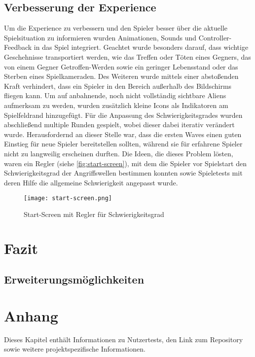 \documentclass[11pt]{scrartcl}
\begin{document}
\subsection{Verbesserung der Experience}
Um die Experience zu verbessern und den Spieler besser über die aktuelle Spielsituation zu informieren wurden Animationen, Sounds und Controller-Feedback in das Spiel integriert. Geachtet wurde besonders darauf, dass wichtige Geschehnisse transportiert werden, wie das Treffen oder Töten eines Gegners, das von einem Gegner Getroffen-Werden sowie ein geringer Lebensstand oder das Sterben eines Spielkameraden. Des Weiteren wurde mittels einer abstoßenden Kraft verhindert, dass ein Spieler in den Bereich außerhalb des Bildschirms fliegen kann. Um auf anbahnende, noch nicht vollständig sichtbare Aliens aufmerksam zu werden, wurden zusätzlich kleine Icons als Indikatoren am Spielfeldrand hinzugefügt.
Für die Anpassung des Schwierigkeitsgrades wurden abschließend multiple Runden gespielt, wobei dieser dabei iterativ verändert wurde. Herausfordernd an dieser Stelle war, dass die ersten Waves einen guten Einstieg für neue Spieler bereitstellen sollten, während sie für erfahrene Spieler nicht zu langweilig erscheinen durften. Die Ideen, die dieses Problem lösten, waren ein Regler (siehe \autoref{fig:start-screen}), mit dem die Spieler vor Spielstart den Schwierigkeitsgrad der Angriffswellen bestimmen konnten sowie Spieletests mit deren Hilfe die allgemeine Schwierigkeit angepasst wurde.

\begin{figure}[htp]
	\centering
	\texttt{[image: start-screen.png]}
	\caption{Start-Screen mit Regler für Schwierigkeitsgrad}
	\label{fig:start-screen}
\end{figure}



\newpage
\section{Fazit}
\subsection{Erweiterungsmöglichkeiten}
\label{subsec:improvements}
\newpage
\section{Anhang}
\label{sec:appendix}
Dieses Kapitel enthält Informationen zu Nutzertests, den Link zum Repository sowie weitere projektspezifische Informationen.
\end{document}
